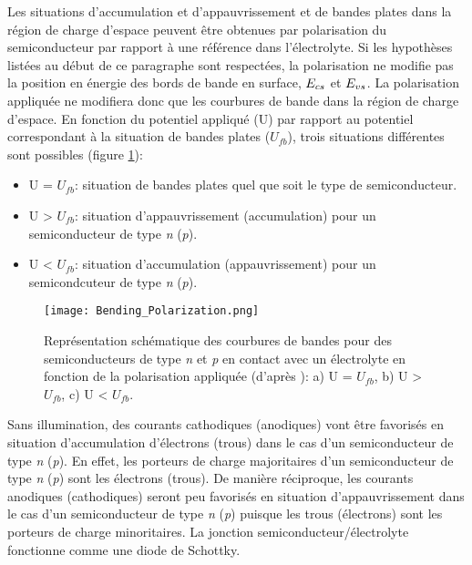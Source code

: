 \begin{refsection}
    Les situations d'accumulation et d'appauvrissement et de bandes plates dans la région de charge d'espace
    peuvent être obtenues par polarisation du semiconducteur par rapport à une référence dans l'électrolyte. Si les
    hypothèses listées au début de ce paragraphe sont respectées, la polarisation ne modifie
    pas la position en énergie des bords de bande en surface, $E_{cs}$ et $E_{vs}$.
    La polarisation appliquée ne modifiera donc que les courbures de bande dans la région de charge d'espace.
    En fonction du potentiel appliqué (U) par rapport au potentiel correspondant à la situation de bandes plates
    ($U_{fb}$), trois situations différentes sont possibles (figure \ref{fig:bending_polarization}):

    \begin{itemize}
        \item U = $U_{fb}$: situation de bandes plates quel que soit le type de semiconducteur.
        \item U > $U_{fb}$: situation d'appauvrissement (accumulation) pour un semiconducteur de type \emph{n}
        (\emph{p}).
        \item U < $U_{fb}$: situation d'accumulation (appauvrissement) pour un semicondcuteur de type \emph{n}
        (\emph{p}).
    \end{itemize}

        
    \begin{figure}[H]
        \centering
        \texttt{[image: Bending\_Polarization.png]}
        \caption[Représentation schématique des courbures de bandes pour des semiconducteurs de type \emph{n} et \emph{p}
        en contact avec un électrolyte en fonction de la polarisation appliquée: 
        a) U = $U_{fb}$,
        b) U > $U_{fb}$,
        c) U < $U_{fb}$.]
        {Représentation schématique des courbures de bandes pour des semiconducteurs de type \emph{n} et \emph{p}
            en contact avec un électrolyte en fonction de la polarisation appliquée (d'après \citet{Bard2002,
            Memming2008}): 
        a) U = $U_{fb}$, 
        b) U > $U_{fb}$, 
        c) U < $U_{fb}$.}
       \label{fig:bending_polarization}
    \end{figure}

    Sans illumination, des courants cathodiques (anodiques) vont être favorisés en situation d'accumulation d'électrons
    (trous) dans le cas d'un semiconducteur de type \emph{n} (\emph{p}). En effet, les porteurs de charge majoritaires
    d'un semiconducteur de type \emph{n} (\emph{p}) sont les électrons (trous). De manière réciproque, les courants
    anodiques (cathodiques) seront peu favorisés en situation d'appauvrissement dans le cas d'un semiconducteur de type
    \emph{n} (\emph{p}) puisque les trous (électrons) sont les porteurs de charge minoritaires. La jonction
    semiconducteur/électrolyte fonctionne comme une diode de Schottky.
             

\end{refsection}
